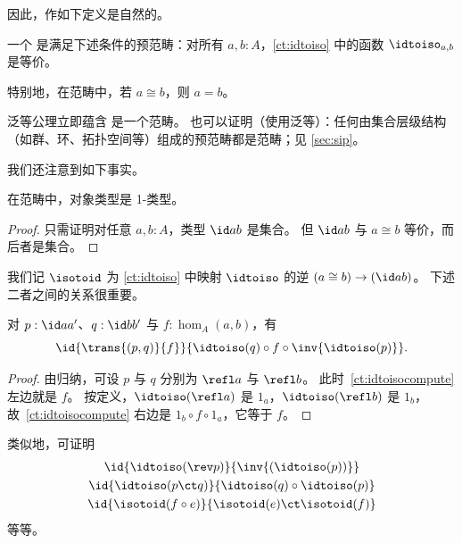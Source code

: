因此，作如下定义是自然的。

\begin{defn}\label{ct:category}
  一个
  是满足下述条件的预范畴：对所有 $a,b:A$，\cref{ct:idtoiso} 中的函数 $\idtoiso_{a,b}$ 是等价。
\end{defn}

特别地，在范畴中，若 $a\cong b$，则 $a=b$。

\begin{eg}\label{ct:eg:set}
  泛等公理立即蕴含 \uset 是一个范畴。
  也可以证明（使用泛等）：任何由集合层级结构（如群、环、拓扑空间等）组成的预范畴都是范畴；见 \cref{sec:sip}。
\end{eg}

我们还注意到如下事实。

\begin{lem}\label{ct:obj-1type}
  在范畴中，对象类型是 1-类型。
\end{lem}
\begin{proof}
  只需证明对任意 $a,b:A$，类型 $\id a b$ 是集合。
  但 $\id a b$ 与 $a \cong b$ 等价，而后者是集合。
\end{proof}

我们记 $\isotoid$ 为 \cref{ct:idtoiso} 中映射 $\idtoiso$ 的逆 $(a\cong b) \to (\id a b)$。
下述二者之间的关系很重要。

\begin{lem}\label{ct:idtoiso-trans}
  对 $p:\id a a'$、$q:\id b b'$ 与 $f:\hom_A(a,b)$，有
  \begin{equation}\label{ct:idtoisocompute}
    \id{\trans{(p,q)}{f}}
    {\idtoiso(q)\circ f \circ \inv{\idtoiso(p)}}.
  \end{equation}
\end{lem}
\begin{proof}
  由归纳，可设 $p$ 与 $q$ 分别为 $\refl a$ 与 $\refl b$。
此时~\eqref{ct:idtoisocompute} 左边就是 $f$。
  按定义，$\idtoiso(\refl a)$ 是 $1_a$，$\idtoiso(\refl b)$ 是 $1_b$，故~\eqref{ct:idtoisocompute} 右边是 $1_b\circ f\circ 1_a$，它等于 $f$。
\end{proof}

类似地，可证明
\begin{gather}
  \id{\idtoiso(\rev p)}{\inv {(\idtoiso(p))}}\\
  \id{\idtoiso(p\ct q)}{\idtoiso(q)\circ \idtoiso(p)}\\
  \id{\isotoid(f\circ e)}{\isotoid(e)\ct \isotoid(f)}
\end{gather}
等等。

